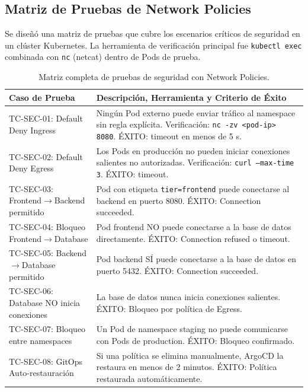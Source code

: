 \subsection{Matriz de Pruebas de Network Policies}

Se diseñó una matriz de pruebas que cubre los escenarios críticos de seguridad en un clúster Kubernetes. La herramienta de verificación principal fue \texttt{kubectl exec} combinada con \texttt{nc} (netcat) dentro de Pods de prueba.

\begin{table}[htbp]
\centering
\scriptsize
\caption{Matriz completa de pruebas de seguridad con Network Policies.}
\label{tab:matriz-seguridad}
\begin{tabularx}{\textwidth}{|Y|Y|}
\hline
\textbf{Caso de Prueba} & \textbf{Descripción, Herramienta y Criterio de Éxito} \\
\hline
TC-SEC-01: Default Deny Ingress & Ningún Pod externo puede enviar tráfico al namespace sin regla explícita. Verificación: \texttt{nc -zv <pod-ip> 8080}. ÉXITO: timeout en menos de 5 s. \\
\hline
TC-SEC-02: Default Deny Egress & Los Pods en producción no pueden iniciar conexiones salientes no autorizadas. Verificación: \texttt{curl --max-time 3}. ÉXITO: timeout. \\
\hline
TC-SEC-03: Frontend$\rightarrow$Backend permitido & Pod con etiqueta \texttt{tier=frontend} puede conectarse al backend en puerto 8080. ÉXITO: Connection succeeded. \\
\hline
TC-SEC-04: Bloqueo Frontend$\rightarrow$Database & Pod frontend NO puede conectarse a la base de datos directamente. ÉXITO: Connection refused o timeout. \\
\hline
TC-SEC-05: Backend$\rightarrow$Database permitido & Pod backend SÍ puede conectarse a la base de datos en puerto 5432. ÉXITO: Connection succeeded. \\
\hline
TC-SEC-06: Database NO inicia conexiones & La base de datos nunca inicia conexiones salientes. ÉXITO: Bloqueo por política de Egress. \\
\hline
TC-SEC-07: Bloqueo entre namespaces & Un Pod de namespace staging no puede comunicarse con Pods de production. ÉXITO: Bloqueo confirmado. \\
\hline
TC-SEC-08: GitOps Auto-restauración & Si una política se elimina manualmente, ArgoCD la restaura en menos de 2 minutos. ÉXITO: Política restaurada automáticamente. \\
\hline
\end{tabularx}
\end{table}

